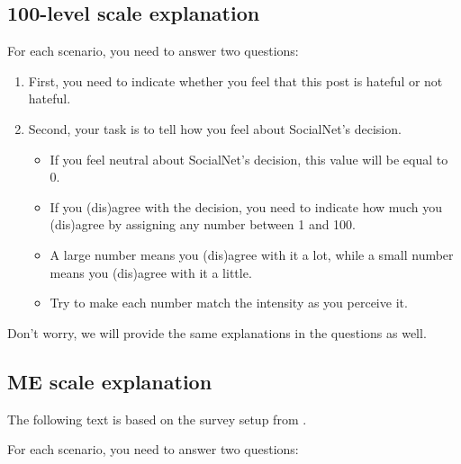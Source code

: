 \subsection{100-level scale explanation}
For each scenario, you need to answer two questions:
\begin{enumerate}
    \item First, you need to indicate whether you feel that this post is hateful or not hateful.
    \item Second, your task is to tell how you feel about SocialNet's decision.
          \begin{itemize}
              \item If you feel neutral about SocialNet's decision, this value will be equal to 0.
              \item If you (dis)agree with the decision, you need to indicate how much you (dis)agree by assigning any number between 1 and 100.
              \item A large number means you (dis)agree with it a lot, while a small number means you (dis)agree with it a little.
              \item Try to make each number match the intensity as you perceive it.
          \end{itemize}
\end{enumerate}

\begin{flushleft}
    Don't worry, we will provide the same explanations in the questions as well.
\end{flushleft}

\subsection{ME scale explanation}
The following text is based on the survey setup from \citet{moskowitz1977magnitude}.\\

\begin{flushleft}
    For each scenario, you need to answer two questions:
\end{flushleft}

